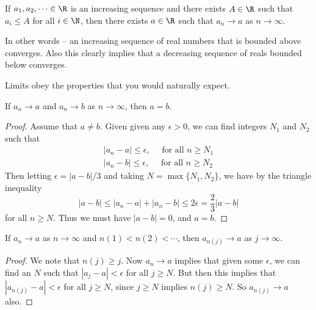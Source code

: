 \documentclass[a4paper]{scrartcl}
\begin{document}
\begin{axiomthm}
If $a_1, a_2, \dots \in \R$ is an increasing sequence and there exists $A \in \R$ such that $a_i \leq A$ for all $i \in \N$, then there exists $a \in \R$ such that $a_n \rightarrow a$ as $n \rightarrow \infty$.
\end{axiomthm}

In other words -- an increasing sequence of real numbers that is bounded above converges. Also this clearly implies that a decreasing sequence of reals bounded below converges.

Limits obey the properties that you would naturally expect.
 
\begin{proposition}
	If $a_n \rightarrow a$ and $a_n \rightarrow b$ as $n \rightarrow \infty$, then $a = b$.
\end{proposition}
\begin{proof}
	Assume that $a \neq b$. Given given any $\epsilon > 0$, we can find integers $N_1$ and $N_2$ such that
	\begin{align*}
		|a_n - a| \leq \epsilon, \quad \text{ for all $n \geq N_1$}\\
		|a_n - b| \leq \epsilon, \quad \text{ for all $n \geq N_2$}
	\end{align*}
	Then letting $\epsilon = |a - b|/3$ and taking $N = \max\{N_1, N_2\}$, we have by the triangle inequality
	$$
	|a - b| \leq |a_n - a| + |a_n - b| \leq 2\epsilon = \frac{2}{3} |a - b|
	$$
	for all $n \geq N$.
	Thus we must have $|a - b| = 0$, and $a = b$.
\end{proof}

\begin{proposition}
	If $a_n \rightarrow a$ as $n \rightarrow \infty$ and $n(1) < n(2) < \cdots$, then $a_{n(j)} \rightarrow a$ as $j \rightarrow \infty$.
\end{proposition}
\begin{proof}
	We note that $n(j) \geq j$. Now $a_n \rightarrow a$ implies that given some $\epsilon$, we can find an $N$ such that $|a_j - a| < \epsilon$ for all $j \geq N$. But then this implies that $|a_{n(j)} - a| < \epsilon$ for all $j \geq N$, since $j \geq N$ implies $n(j) \geq N$. So $a_{n(j)} \rightarrow a$ also.
\end{proof}
\end{document}
